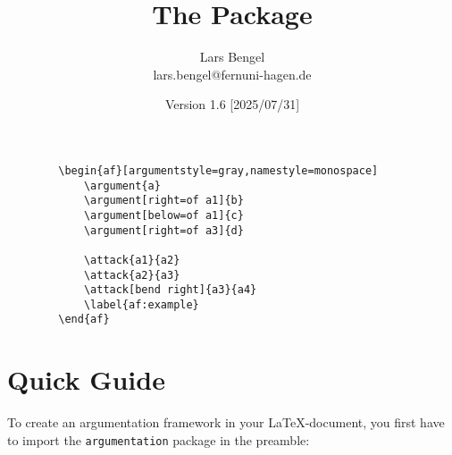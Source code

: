 \documentclass{scrartcl}
\title{The \argumentation Package}
\author{Lars Bengel\footnotemark\\\small lars.bengel@fernuni-hagen.de}
\date{Version 1.6 [2025/07/31]}
\newcommand{\argumentation}{\texttt{argumentation}\xspace}
\begin{document}
\maketitle

\renewcommand*{\thefootnote}{\fnsymbol{footnote}}
\renewcommand*{\thefootnote}{\arabic{footnote}}

\begin{minipage}{.26\textwidth}
    \centering
        \begin{af}[argumentstyle=gray,namestyle=monospace]
    
            \label{af:example}
        \end{af}
\end{minipage}
\begin{minipage}{.5\textwidth}
    \begin{small}
    \begin{verbatim}
        \begin{af}[argumentstyle=gray,namestyle=monospace]
            \argument{a}
            \argument[right=of a1]{b}
            \argument[below=of a1]{c}
            \argument[right=of a3]{d}
    
            \attack{a1}{a2}
            \attack{a2}{a3}
            \attack[bend right]{a3}{a4}
            \label{af:example}
        \end{af}
    \end{verbatim}
    \end{small}
\end{minipage}

\tableofcontents

\newpage

\section{Quick Guide}\label{sec:quick}
\noindent
To create an argumentation framework in your \LaTeX-document, you first have to import the \argumentation package in the preamble:\\
\end{document}
